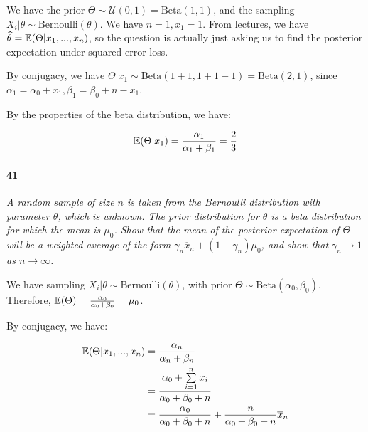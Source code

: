 \documentclass[a4paper]{article}
\begin{document}
                We have the prior $\Theta \sim \mathcal{U}(0, 1) =
                \text{Beta}(1, 1)$, and the sampling $X_i | \theta \sim
                \text{Bernoulli}(\theta)$. We have $n = 1, x_1 = 1$. From
                lectures, we have $\widehat \theta = \mathbb{E}(\Theta | x_1, ...,
                x_n)$, so the question is actually just asking us to find the
                posterior expectation under squared error loss.

                By conjugacy, we have $\Theta | x_1 \sim \text{Beta}(1 + 1, 1 +
                1 - 1) = \text{Beta}(2, 1)$, since $\alpha_1 = \alpha_0 + x_1,
                \beta_1 = \beta_0 + n - x_1$.

                By the properties of the beta distribution, we have:

                \[
                    \mathbb{E}(\Theta | x_1) = \frac{\alpha_1}{\alpha_1 + \beta_1} =
                    \frac{2}{3}
                \]

            \paragraph{41}
            \textit{A random sample of size $n$ is taken from the Bernoulli
            distribution with parameter $\theta$, which is unknown. The prior
            distribution for $\theta$ is a beta distribution for which the mean
            is $\mu_0$. Show that the mean of the posterior expectation of
            $\Theta$ will be a weighted average of the form $\gamma_n \overline
            x_n + (1 - \gamma_n)\mu_0$, and show that $\gamma_n \to 1$ as $n \to
            \infty$.}

                We have sampling $X_i | \theta \sim \text{Bernoulli}(\theta)$,
                with prior $\Theta \sim \text{Beta}(\alpha_0, \beta_0)$.
                Therefore, $\mathbb{E}(\Theta) = \frac{\alpha_0}{\alpha_0 + \beta_0} =
                \mu_0$.

                By conjugacy, we have:

                \begin{align*}
                    \mathbb{E}(\Theta | x_1, ..., x_n) & = \frac{\alpha_n}{\alpha_n +
                        \beta_n} \\
                    & = \frac{\alpha_0 + \sum\limits_{i=1}^n x_i} {\alpha_0 +
                        \beta_0 + n} \\
                    & = \frac{\alpha_0}{\alpha_0 + \beta_0 + n} + \frac{n}
                        {\alpha_0 + \beta_0 + n}\overline x_n
                \end{align*}
\end{document}
